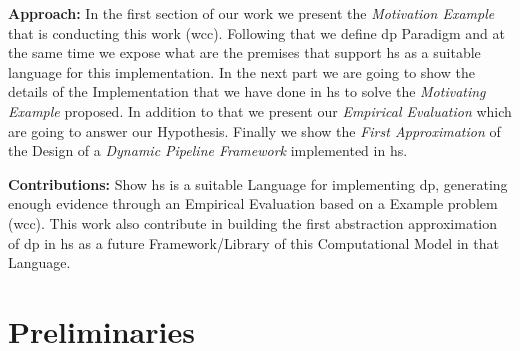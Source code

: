 \documentclass[preprint]{elsarticle}
\begin{document}
\textbf{Approach:} In the first section of our work we present the \emph{Motivation Example} that is conducting this work (\acrshort{wcc}). Following that we define \acrshort{dp} Paradigm and at the same time we expose what are the premises that support \acrshort{hs} as a suitable language for this implementation.
In the next part we are going to show the details of the Implementation that we have done in \acrshort{hs} to solve the \emph{Motivating Example} proposed. In addition to that we present our \emph{Empirical Evaluation} which are going to answer our Hypothesis.
Finally we show the \emph{First Approximation} of the Design of a \emph{Dynamic Pipeline Framework} implemented in \acrshort{hs}.

\textbf{Contributions:} Show \acrshort{hs} is a suitable Language for implementing \acrshort{dp}, generating enough evidence through an Empirical Evaluation based on a Example problem (\acrshort{wcc}). This work also contribute in building the first abstraction approximation of \acrshort{dp} in \acrshort{hs} as a future Framework/Library of this Computational Model in that Language. 


\section{Preliminaries}\label{section:prelim}
\end{document}

